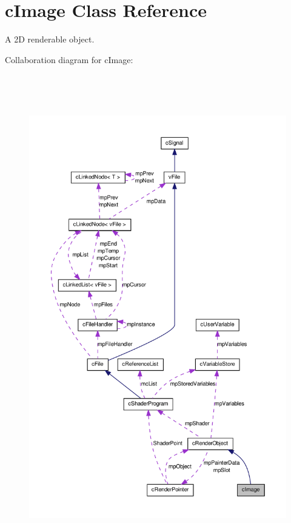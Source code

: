\hypertarget{classc_image}{
\section{cImage Class Reference}
\label{classc_image}
}


A 2D renderable object.  




Collaboration diagram for cImage:\nopagebreak
\begin{figure}[H]
\begin{center}
\leavevmode
\includegraphics[height=600pt]{classc_image__coll__graph}
\end{center}
\end{figure}
